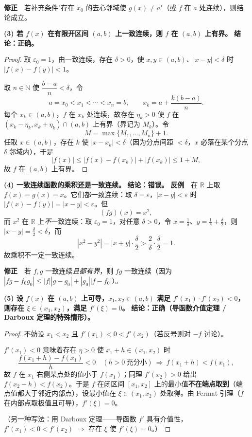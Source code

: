 \documentclass[10pt]{ctexart}
\newcommand{\Rr}{\mathbb{R}}
\newcommand{\Nn}{\mathbb{N}}
\newcommand{\eps}{\varepsilon}
\begin{document}
\noindent\textbf{修正}　若补充条件"存在 $x_0$ 的去心邻域使 $g(x)\neq a$"（或 $f$ 在 $a$ 处连续），则结论成立。

\vspace{2pt}
\textbf{(3) 若 $f(x)$ 在有限开区间 $(a,b)$ 上一致连续，则 $f$ 在 $(a,b)$ 上有界。}
\noindent\textbf{结论：正确。}
\begin{proof}
取 $\eps_0=1$，由一致连续，存在 $\delta>0$，使 $x,y\in(a,b)$、$|x-y|<\delta$ 时 $|f(x)-f(y)|<1$。

取 $n\in\Nn$ 使 $\dfrac{b-a}{n}<\delta$，令
\[
a=x_0<x_1<\cdots<x_n=b,\qquad x_k=a+\frac{k(b-a)}{n}.
\]
每个 $x_k\in(a,b)$，$f$ 在 $x_k$ 处连续，故存在 $\eta_k>0$ 使 $f$ 在 $(x_k-\eta_k,x_k+\eta_k)\cap(a,b)$ 上有界（界记为 $M_k$）。令
\[
M=\max\{M_1,\dots,M_n\}+1 .
\]
任取 $x\in(a,b)$，存在 $k$ 使 $|x-x_k|<\delta$（因为分点间距 $<\delta$，$x$ 必落在某个分点 $\delta$ 邻域内），于是
\[
|f(x)|\le|f(x)-f(x_k)|+|f(x_k)|\le 1+M ,
\]
故 $f$ 在 $(a,b)$ 上有界。
\end{proof}

\vspace{2pt}
\textbf{(4) 一致连续函数的乘积还是一致连续。}
\noindent\textbf{结论：错误。}
\noindent\textbf{反例}　在 $\Rr$ 上取 $f(x)=g(x)=x$。它们都一致连续：取 $\delta=\eps$，$|x-y|<\eps$ 时 $|f(x)-f(y)|=|x-y|<\eps$。但
\[
(fg)(x)=x^2 ,
\]
而 $x^2$ 在 $\Rr$ 上\emph{不}一致连续：取 $\eps_0=1$，对任意 $\delta>0$，令 $x=\frac1\delta$、$y=\frac1\delta+\frac{\delta}{2}$，则 $|x-y|=\frac\delta2<\delta$，而
\[
|x^2-y^2|=\Big|x+y\Big|\cdot\frac\delta2>\frac{2}{\delta}\cdot\frac\delta2=1 .
\]
故乘积不一定一致连续。

\noindent\textbf{修正}　若 $f,g$ 一致连续\emph{且都有界}，则 $fg$ 一致连续（因为 $|fg-f_0g_0|\le|f||g-g_0|+|g_0||f-f_0|$）。

\vspace{2pt}
\textbf{(5) 设 $f(x)$ 在 $(a,b)$ 上可导，$x_1,x_2\in(a,b)$ 满足 $f'(x_1)\cdot f'(x_2)<0$，则存在 $\xi\in(x_1,x_2)$，满足 $f'(\xi)=0$。}
\noindent\textbf{结论：正确（导函数介值定理 / Darboux 定理的特殊情形）。}
\begin{proof}
不妨设 $x_1<x_2$ 且 $f'(x_1)<0<f'(x_2)$（若反号则对 $-f$ 讨论）。

$f'(x_1)<0$ 意味着存在 $\eta>0$ 使 $x_1+h\in(x_1,x_2)$ 时
\[
\frac{f(x_1+h)-f(x_1)}{h}<0\quad(h>0\ \text{充分小})\ \Longrightarrow\ f(x_1+h)<f(x_1),
\]
故 $f$ 在 $x_1$ 右侧某点处的值小于 $f(x_1)$；同理 $f'(x_2)>0$ 给出 $f(x_2-h)<f(x_2)$。于是 $f$ 在闭区间 $[x_1,x_2]$ 上的最小值\textbf{不在端点取到}（端点值都大于邻近内部点），设最小值在 $\xi\in(x_1,x_2)$ 处取得。由 Fermat 引理（$f$ 在内部点取极值且可导），$f'(\xi)=0$。

（另一种写法：用 Darboux 定理——导函数 $f'$ 具有介值性，$f'(x_1)<0<f'(x_2)$ $\Rightarrow$ 存在 $\xi$ 使 $f'(\xi)=0$。）
\end{proof}
\end{document}
